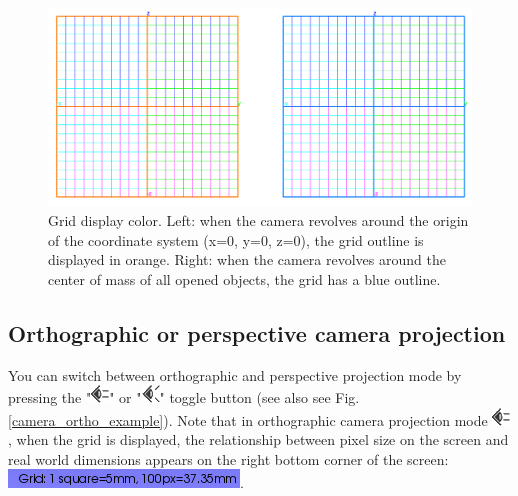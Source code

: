 \begin{figure}
  \centering
  \includegraphics[scale=0.4]{images/06/camera/grids.png} 
	\caption{Grid display color. Left: when the camera revolves around the origin of the coordinate system (x=0, y=0, z=0), the grid outline is displayed in orange. Right: when the camera revolves around the center of mass of all opened objects, the grid has a blue outline.}
\label{grid_color}
 
\end{figure}

 
\subsection{Orthographic or perspective camera projection}
You can switch between orthographic and perspective projection mode by pressing the "\includegraphics[scale=0.7]{images/06/camera/camera_ortho.png}" or "\includegraphics[scale=0.7]{images/06/camera/camera_persp}" toggle button (see also see Fig. \ref{camera_ortho_example}).
Note that in orthographic camera projection mode \includegraphics[scale=0.7]{images/06/camera/camera_ortho.png}, when the grid is displayed, the relationship between pixel size on the screen and real world dimensions appears on the right bottom corner of the screen: \includegraphics[scale=0.7]{images/06/camera/grid_infos.png}. 

